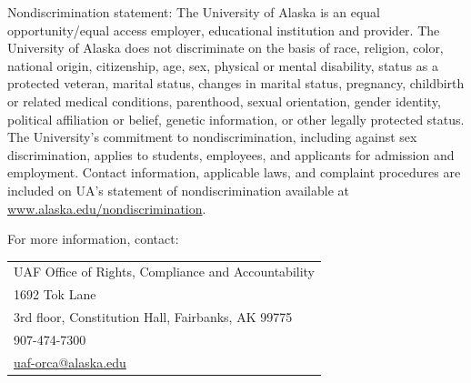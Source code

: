 \documentclass[11pt]{article}
\begin{document}
Nondiscrimination statement: The University of Alaska is an equal opportunity/equal access employer, educational institution and provider. The University of Alaska does not discriminate on the basis of race, religion, color, national origin, citizenship, age, sex, physical or mental disability, status as a protected veteran, marital status, changes in marital status, pregnancy, childbirth or related medical conditions, parenthood, sexual orientation, gender identity, political affiliation or belief, genetic information, or other legally protected status. The University's commitment to nondiscrimination, including against sex discrimination, applies to students, employees, and applicants for admission and employment. Contact information, applicable laws, and complaint procedures are included on UA's statement of nondiscrimination available at \url{www.alaska.edu/nondiscrimination}.


For more information, contact: 
\begin{tabular}{l}
UAF Office of Rights, Compliance and Accountability\\
1692 Tok Lane\\
3rd floor, Constitution Hall, Fairbanks, AK 99775\\
907-474-7300\\
\url{uaf-orca@alaska.edu}
\end{tabular}
\end{document}

